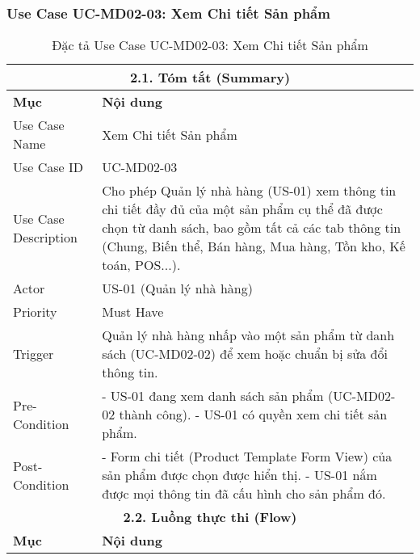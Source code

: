 \subsubsection{Use Case UC-MD02-03: Xem Chi tiết Sản phẩm}

\begin{longtable}{|m{4cm}|p{11cm}|}
\caption{Đặc tả Use Case UC-MD02-03: Xem Chi tiết Sản phẩm} \label{tab:uc_md02_03_revised} \\
\hline
\multicolumn{2}{|c|}{\textbf{2.1. Tóm tắt (Summary)}} \\
\hline
\textbf{Mục} & \textbf{Nội dung} \\
\hline
\endhead %
\hline
\endfoot %
\hline
\endlastfoot %
Use Case Name & Xem Chi tiết Sản phẩm \\
\hline
Use Case ID & UC-MD02-03 \\
\hline
Use Case Description & Cho phép Quản lý nhà hàng (US-01) xem thông tin chi tiết đầy đủ của một sản phẩm cụ thể đã được chọn từ danh sách, bao gồm tất cả các tab thông tin (Chung, Biến thể, Bán hàng, Mua hàng, Tồn kho, Kế toán, POS...). \\
\hline
Actor & US-01 (Quản lý nhà hàng) \\
\hline
Priority & Must Have \\
\hline
Trigger & Quản lý nhà hàng nhấp vào một sản phẩm từ danh sách (UC-MD02-02) để xem hoặc chuẩn bị sửa đổi thông tin. \\
\hline
Pre-Condition & - US-01 đang xem danh sách sản phẩm (UC-MD02-02 thành công). \newline - US-01 có quyền xem chi tiết sản phẩm. \\
\hline
Post-Condition & - Form chi tiết (Product Template Form View) của sản phẩm được chọn được hiển thị. \newline - US-01 nắm được mọi thông tin đã cấu hình cho sản phẩm đó. \\
\hline
\multicolumn{2}{|c|}{\textbf{2.2. Luồng thực thi (Flow)}} \\
\hline
\textbf{Mục} & \textbf{Nội dung} \\
\hline

\end{longtable}

